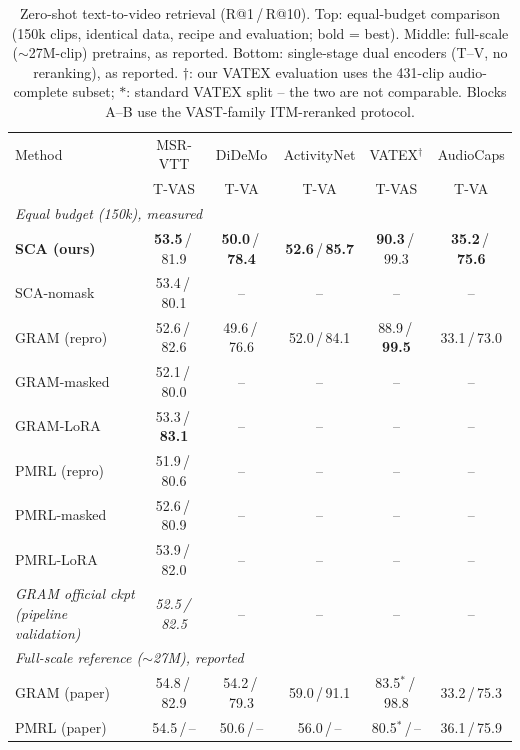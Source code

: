\begin{table}[t]
\centering
\caption{Zero-shot text-to-video retrieval (R@1\,/\,R@10). Top: equal-budget
comparison (150k clips, identical data, recipe and evaluation; bold = best).
Middle: full-scale ($\sim$27M-clip) pretrains, as reported. Bottom:
single-stage dual encoders (T--V, no reranking), as reported.
$\dagger$: our VATEX evaluation uses the 431-clip audio-complete subset;
$*$: standard VATEX split -- the two are not comparable.
Blocks A--B use the VAST-family ITM-reranked protocol.}
\label{tab:main_zeroshot_t2v}
\small
\begin{tabular}{lccccc}
\toprule
Method & MSR-VTT & DiDeMo & ActivityNet & VATEX$^{\dagger}$ & AudioCaps \\
 & T-VAS & T-VA & T-VA & T-VAS & T-VA \\
\midrule
\multicolumn{6}{l}{\emph{Equal budget (150k), measured}} \\
\textbf{SCA (ours)} & \textbf{53.5}\,/\,81.9 & \textbf{50.0}\,/\,\textbf{78.4} & \textbf{52.6}\,/\,\textbf{85.7} & \textbf{90.3}\,/\,99.3 & \textbf{35.2}\,/\,\textbf{75.6} \\
SCA-nomask & 53.4\,/\,80.1 & -- & -- & -- & -- \\
GRAM (repro) & 52.6\,/\,82.6 & 49.6\,/\,76.6 & 52.0\,/\,84.1 & 88.9\,/\,\textbf{99.5} & 33.1\,/\,73.0 \\
GRAM-masked & 52.1\,/\,80.0 & -- & -- & -- & -- \\
GRAM-LoRA & 53.3\,/\,\textbf{83.1} & -- & -- & -- & -- \\
PMRL (repro) & 51.9\,/\,80.6 & -- & -- & -- & -- \\
PMRL-masked & 52.6\,/\,80.9 & -- & -- & -- & -- \\
PMRL-LoRA & 53.9\,/\,82.0 & -- & -- & -- & -- \\
\emph{GRAM official ckpt (pipeline validation)} & \emph{52.5\,/\,82.5} & -- & -- & -- & -- \\
\midrule
\multicolumn{6}{l}{\emph{Full-scale reference ($\sim$27M), reported}} \\
GRAM (paper) & 54.8\,/\,82.9 & 54.2\,/\,79.3 & 59.0\,/\,91.1 & 83.5$^{*}$\,/\,98.8 & 33.2\,/\,75.3 \\
PMRL (paper) & 54.5\,/\,-- & 50.6\,/\,-- & 56.0\,/\,-- & 80.5$^{*}$\,/\,-- & 36.1\,/\,75.9 \\

\end{tabular}
\end{table}
